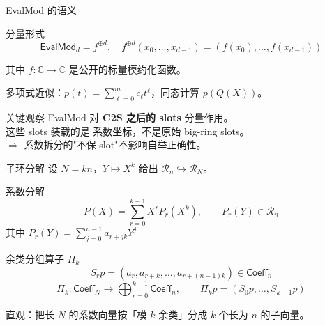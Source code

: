 \documentclass[aspectratio=169, 10pt, xcolor=svgnames, table, UTF8]{ctexbeamer}
\newcommand{\evalmod}{\mathsf{EvalMod}}
\newcommand{\ringR}{\mathcal{R}}
\newcommand{\ringC}{\mathbb{C}}
\newcommand{\coeffSpace}{\mathsf{Coeff}}
\begin{document}
\begin{frame}{EvalMod 的语义}
  \begin{block}{分量形式}
    \[
    \evalmod_d = f^{\oplus d},
    \quad
    f^{\oplus d}(x_0,\ldots,x_{d-1}) = (f(x_0),\ldots,f(x_{d-1}))
    \]
  \end{block}
  
  \pause
  
  其中 \(f: \ringC \to \ringC\) 是公开的标量模约化函数。
  
  多项式近似：\(p(t) = \sum_{\ell=0}^{m} c_\ell t^\ell\)，同态计算 \(p(Q(X))\)。
  
  \pause
  
  \begin{exampleblock}{关键观察}
    EvalMod 对 \textbf{C2S 之后的 slots} 分量作用。\\
    这些 slots 装载的是 \alert{系数坐标}，不是原始 big-ring slots。\\
    \(\Rightarrow\) 系数拆分的"不保 slot"不影响自举正确性。
  \end{exampleblock}
\end{frame}

\begin{frame}{子环分解}
  设 \(N = kn\)，\(Y \mapsto X^k\) 给出 \(\ringR_n \hookrightarrow \ringR_N\)。
  
  \begin{block}{系数分解}
    \[
    P(X) = \sum_{r=0}^{k-1} X^r P_r(X^k), \qquad P_r(Y) \in \ringR_n
    \]
    其中 \(P_r(Y) = \sum_{j=0}^{n-1} a_{r+jk} Y^j\)
  \end{block}
  
  \pause
  
  \begin{block}{余类分组算子 \(\Pi_k\)}
    \vspace{-0.3cm}
    \[
    S_r p = (a_r, a_{r+k}, \ldots, a_{r+(n-1)k}) \in \coeffSpace_n
    \]
    \[
    \boxed{\Pi_k : \coeffSpace_N \to \bigoplus_{r=0}^{k-1} \coeffSpace_n},
    \qquad
    \Pi_k p = (S_0 p, \ldots, S_{k-1} p)
    \]
  \end{block}
  
  直观：把长 \(N\) 的系数向量按「模 \(k\) 余类」分成 \(k\) 个长为 \(n\) 的子向量。
\end{frame}
\end{document}
